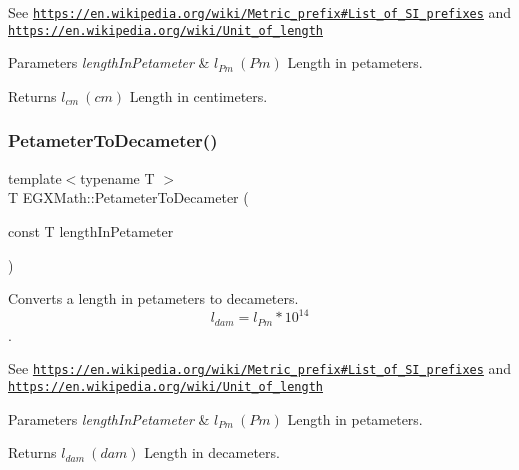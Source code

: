 See \href{https://en.wikipedia.org/wiki/Metric_prefix#List_of_SI_prefixes}{\tt https\+://en.\+wikipedia.\+org/wiki/\+Metric\+\_\+prefix\#\+List\+\_\+of\+\_\+\+S\+I\+\_\+prefixes} and \href{https://en.wikipedia.org/wiki/Unit_of_length}{\tt https\+://en.\+wikipedia.\+org/wiki/\+Unit\+\_\+of\+\_\+length} 
\begin{DoxyParams}{Parameters}
{\em length\+In\+Petameter} & $ l_{Pm}\ (Pm)$ Length in petameters. \\
\hline
\end{DoxyParams}
\begin{DoxyReturn}{Returns}
$ l_{cm}\ (cm)$ Length in centimeters. 
\end{DoxyReturn}
\mbox{\label{group___e_g_x_math-_conversions-_length_conversions-_s_i-_petameter-_s_i_gaf0fe67e33a48584d1f9f0ffa1ca4c8f9}} 
\subsubsection{\texorpdfstring{Petameter\+To\+Decameter()}{PetameterToDecameter()}}
{\footnotesize\ttfamily template$<$typename T $>$ \\
T E\+G\+X\+Math\+::\+Petameter\+To\+Decameter (\begin{DoxyParamCaption}\item[{const T}]{length\+In\+Petameter }\end{DoxyParamCaption})}



Converts a length in petameters to decameters. \[ l_{dam}=l_{Pm} * 10^{14} \]. 

See \href{https://en.wikipedia.org/wiki/Metric_prefix#List_of_SI_prefixes}{\tt https\+://en.\+wikipedia.\+org/wiki/\+Metric\+\_\+prefix\#\+List\+\_\+of\+\_\+\+S\+I\+\_\+prefixes} and \href{https://en.wikipedia.org/wiki/Unit_of_length}{\tt https\+://en.\+wikipedia.\+org/wiki/\+Unit\+\_\+of\+\_\+length} 
\begin{DoxyParams}{Parameters}
{\em length\+In\+Petameter} & $ l_{Pm}\ (Pm)$ Length in petameters. \\
\hline
\end{DoxyParams}
\begin{DoxyReturn}{Returns}
$ l_{dam}\ (dam)$ Length in decameters. 
\end{DoxyReturn}
\mbox{\label{group___e_g_x_math-_conversions-_length_conversions-_s_i-_petameter-_s_i_ga1e0359fb350c64cd3e1fc9293376de96}} 
